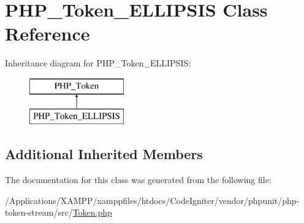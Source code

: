 \hypertarget{class_p_h_p___token___e_l_l_i_p_s_i_s}{}\section{P\+H\+P\+\_\+\+Token\+\_\+\+E\+L\+L\+I\+P\+S\+IS Class Reference}
\label{class_p_h_p___token___e_l_l_i_p_s_i_s}
Inheritance diagram for P\+H\+P\+\_\+\+Token\+\_\+\+E\+L\+L\+I\+P\+S\+IS\+:\begin{figure}[H]
\begin{center}
\leavevmode
\includegraphics[height=2.000000cm]{class_p_h_p___token___e_l_l_i_p_s_i_s}
\end{center}
\end{figure}
\subsection*{Additional Inherited Members}


The documentation for this class was generated from the following file\+:\begin{DoxyCompactItemize}
\item 
/\+Applications/\+X\+A\+M\+P\+P/xamppfiles/htdocs/\+Code\+Igniter/vendor/phpunit/php-\/token-\/stream/src/\mbox{\hyperlink{_token_8php}{Token.\+php}}\end{DoxyCompactItemize}
